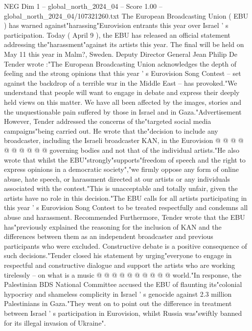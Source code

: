 \begin{textsample}{NEG Dim 1 – global\_north\_2024\_04 – Score 1.00 – global\_north\_2024\_04/107321260.txt}  \label{ex:f1_neg_255}
The European Broadcasting Union ( EBU ) has warned against"harassing"Eurovision entrants this year over Israel ' s participation.
Today ( April 9 ), the EBU has released an official statement addressing the"harassment"against its artists this year.
The final will be held on May 11 this year in Malm?, Sweden.
Deputy Director General Jean Philip De Tender wrote :"The European Broadcasting Union acknowledges the depth of feeling and the strong opinions that this year ' s Eurovision Song Contest -- set against the backdrop of a terrible war in the Middle East -- has provoked."We understand that people will want to engage in debate and express their deeply held views on this matter.
We have all been affected by the images, stories and the unquestionable pain suffered by those in Israel and in Gaza."Advertisement However, Tender addressed the concerns of the"targeted social media campaigns"being carried out.
He wrote that the"decision to include any broadcaster, including the Israeli broadcaster KAN, in the Eurovision @ @ @ @ @ @ @ @ @ @ governing bodies and not that of the individual artists."He also wrote that whilst the EBU"strongly"supports"freedom of speech and the right to express opinions in a democratic society","we firmly oppose any form of online abuse, hate speech, or harassment directed at our artists or any individuals associated with the contest."This is unacceptable and totally unfair, given the artists have no role in this decision."The EBU calls for all artists participating in this year ' s Eurovision Song Contest to be treated respectfully and condemns all abuse and harassment.
Recommended Furthermore, Tender wrote that the EBU has"previously explained the reasoning for the inclusion of KAN and the differences between them as an independent broadcaster and previous participants who were excluded.
Constructive debate is a positive consequence of such decisions."Tender closed his statement by urging"everyone to engage in respectful and constructive dialogue and support the artists who are working tirelessly -- on what is a music @ @ @ @ @ @ @ @ @ @ world."In response, the Palestinian BDS National Committee accused the EBU of flaunting its"colonial hypocrisy and shameless complicity in Israel ' s genocide against 2.3 million Palestinians in Gaza."They went on to point out the difference in treatment between Israel ' s participation in Eurovision, whilst Russia was"swiftly banned for its illegal invasion of Ukraine".

\end{textsample}
